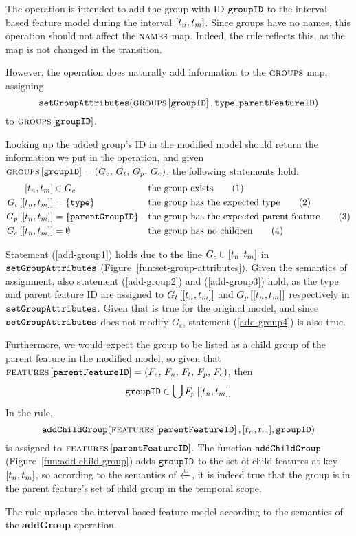 The operation is intended to add the group with ID $\texttt{groupID}$ to the interval-based feature model during the interval $\interval{t_n}{t_m}$. Since groups have no names, this operation should not affect the $\textsc{names}{}$ map. Indeed, the rule reflects this, as the map is not changed in the transition.

However, the operation does naturally add information to the $\textsc{groups}{}{}$ map, assigning
\begin{equation*}
   \texttt{setGroupAttributes}( \textsc{groups}{}{} \left[ \texttt{groupID} \right], \texttt{type}, 
   \texttt{parentFeatureID} )
\end{equation*}
to $\textsc{groups}{} \left[ \texttt{groupID} \right]$.

Looking up the added group's ID in the modified model should return the information we put in the operation, and given $\textsc{groups}{} \left[ \texttt{groupID} \right] = \left(G_e,\, G_t,\, G_p,\, G_c\right)$, the following statements hold:
\begin{align}
   \interval{t_n}{t_m} &\in G_e && \text{the group exists} \tag{1} \label{add-group1}\\
   \lookup{G_t}{\interval{t_n}{t_m}} &= \set{\var{type}}  && \text{the group has the expected type} \tag{2} \label{add-group2}\\
   \lookup{G_p}{\interval{t_n}{t_m}} &= \set{\var{parentGroupID}}  && \text{the group has the expected parent feature} \tag{3} \label{add-group3}\\
   \lookup{G_c}{\interval{t_n}{t_m}} &= \emptyset && \text{the group has no children} \tag{4} \label{add-group4}
\end{align}

Statement (\ref{add-group1}) holds due to the line $G_e \cup \interval{t_n}{t_m}$ in $\texttt{setGroupAttributes}$ (Figure~\vref{fun:set-group-attributes}). Given the semantics of assignment, also statement (\ref{add-group2}) and (\ref{add-group3}) hold, as the type and parent feature ID are assigned to $\lookup{G_t}{\interval{t_n}{t_m}}$ and $\lookup{G_p}{\interval{t_n}{t_m}}$ respectively in $\texttt{setGroupAttributes}$. Given that  is true for the original model, and since $\texttt{setGroupAttributes}$ does not modify $G_c$, statement (\ref{add-group4}) is also true.

Furthermore, we would expect the group to be listed as a child group of the parent feature in the modified model, so given that $\textsc{features}{} \left[ \texttt{parentFeatureID} \right] = \left(F_e,\, F_n,\, F_t,\, F_p,\, F_c\right)$, then
\begin{equation*}
   \var{groupID} \in \bigcup \lookup{F_p}{\interval{t_n}{t_m}}
\end{equation*}
In the  rule, 
\[\var{addChildGroup}(\lookup{\features}{\var{parentFeatureID}}, \interval{t_n}{t_m}, \var{groupID})\]
is assigned to $\textsc{features} \left[ \texttt{parentFeatureID} \right]$. The function $\texttt{addChildGroup}$ (Figure~\vref{fun:add-child-group}) adds $\texttt{groupID}$ to the set of child features at key $\interval{t_n}{t_m}$, so according to the semantics of $\xleftarrow{\cup}$, it is indeed true that the group is in the parent feature's set of child group in the temporal scope.
\\

\begin{lemma}
   The  rule updates the interval-based feature model according to the semantics of the \textbf{addGroup} operation.
   \label{lemma:add-group-mod}
\end{lemma}

